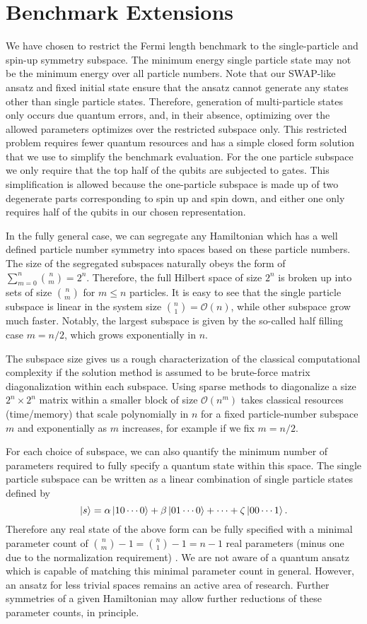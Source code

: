 \documentclass[
prx,
superscriptaddress,
twocolumn,
longbibliography
]{revtex4-1}
\begin{document}
\section{Benchmark Extensions}
\label{app:extend}
We have chosen to restrict the Fermi length benchmark to the single-particle and spin-up symmetry subspace. The minimum energy single particle state may not be the minimum energy over all particle numbers. Note that our SWAP-like ansatz and fixed initial state ensure that the ansatz cannot generate any states other than single particle states. Therefore, generation of multi-particle states only occurs due quantum errors, and, in their absence, optimizing over the allowed parameters optimizes over the restricted subspace only. This restricted problem requires fewer quantum resources and has a simple closed form solution that we use to simplify the benchmark evaluation. For the one particle subspace we only require that the top half of the qubits are subjected to gates. This simplification is allowed because the one-particle subspace is made up of two degenerate parts corresponding to spin up and spin down, and either one only requires half of the qubits in our chosen representation. 

In the fully general case, we can segregate any Hamiltonian which has a well defined particle number symmetry into spaces based on these particle numbers. The size of the segregated subspaces naturally obeys the form of $\sum_{m=0}^n \binom{n}{m} = 2^{n}$. Therefore, the full Hilbert space of size $2^n$ is broken up into sets of size $\binom{n}{m}$ for $m\leq n$ particles. It is easy to see that the single particle subspace is linear in the system size $\binom{n}{1}=\mathcal{O}(n)$, while other subspace grow much faster. Notably, the largest subspace is given by the so-called half filling case $m=n/2$, which grows exponentially in $n$.

The subspace size gives us a rough characterization of the classical computational complexity if the solution method is assumed to be brute-force matrix diagonalization within each subspace. Using sparse methods to diagonalize a size $2^n \times 2^n$ matrix within a smaller block of size $\mathcal{O}(n^m)$ takes classical resources (time/memory) that scale polynomially in $n$ for a fixed particle-number subspace $m$ and exponentially as $m$ increases, for example if we fix $m=n/2$.

For each choice of subspace, we can also quantify the minimum number of parameters required to fully specify a quantum state within this space. The single particle subspace can be written as a linear combination of single particle states defined by 
\[
\ket{s}=\alpha\ket{10\cdots0}+\beta\ket{01\cdots0}+\dots + \zeta\ket{00\cdots1}.
\]
Therefore any real state of the above form can be fully specified with a minimal parameter count of $\binom{n}{m}-1=\binom{n}{1}-1=n-1$ real parameters (minus one due to the normalization requirement) . We are not aware of a quantum ansatz which is capable of matching this minimal parameter count in general.  However, an ansatz for less trivial spaces remains an active area of research. Further symmetries of a given Hamiltonian may allow further reductions of these parameter counts, in principle.
\end{document}
